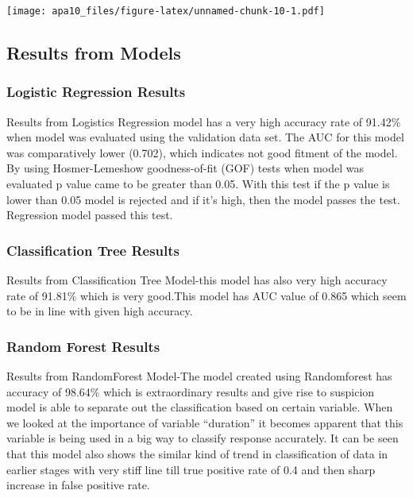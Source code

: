 \documentclass[english,floatsintext,man]{apa6}
\begin{document}
\texttt{[image: apa10\_files/figure-latex/unnamed-chunk-10-1.pdf]}

\subsection{Results from Models}\label{results-from-models}

\subsubsection{Logistic Regression
Results}\label{logistic-regression-results}

Results from Logistics Regression model has a very high accuracy rate of
91.42\% when model was evaluated using the validation data set. The AUC
for this model was comparatively lower (0.702), which indicates not good
fitment of the model. By using Hosmer-Lemeshow goodness-of-fit (GOF)
tests when model was evaluated p value came to be greater than 0.05.
With this test if the p value is lower than 0.05 model is rejected and
if it's high, then the model passes the test. Regression model passed
this test.

\subsubsection{Classification Tree
Results}\label{classification-tree-results}

Results from Classification Tree Model-this model has also very high
accuracy rate of 91.81\% which is very good.This model has AUC value of
0.865 which seem to be in line with given high accuracy.

\subsubsection{Random Forest Results}\label{random-forest-results}

Results from RandomForest Model-The model created using Randomforest has
accuracy of 98.64\% which is extraordinary results and give rise to
suspicion model is able to separate out the classification based on
certain variable. When we looked at the importance of variable
\enquote{duration} it becomes apparent that this variable is being used
in a big way to classify response accurately. It can be seen that this
model also shows the similar kind of trend in classification of data in
earlier stages with very stiff line till true positive rate of 0.4 and
then sharp increase in false positive rate.
\end{document}
